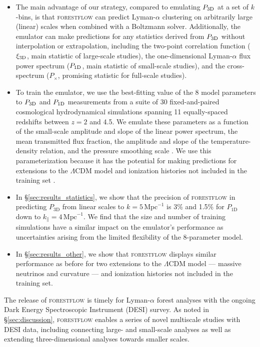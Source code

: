 \documentclass{aa}
\newcommand{\lya}{Lyman-$\alpha$\xspace}
\newcommand{\lyaf}{Lyman-$\alpha$ forest\xspace}
\newcommand{\pcross}{$P_{\times}$\xspace}
\newcommand{\poned}{\ensuremath{P_{\rm 1D}}\xspace}
\newcommand{\xithreed}{\ensuremath{\xi_{\rm 3D}}\xspace}
\newcommand{\pthreed}{\ensuremath{P_{\rm 3D}}\xspace}
\newcommand{\forestflow}{\textsc{forestflow}\xspace}
\newcommand{\iMpc}{\ensuremath{\,\mathrm{Mpc}^{-1}}}
\begin{document}
\begin{itemize}
    \item The main advantage of our strategy, compared to emulating \pthreed at a set of $k$-bins, is that \forestflow can predict \lya clustering on arbitrarily large (linear) scales when combined with a Boltzmann solver. Additionally, the emulator can make predictions for any statistics derived from \pthreed without interpolation or extrapolation, including the two-point correlation function (\xithreed, main statistic of large-scale studies), the one-dimensional \lya flux power spectrum (\poned, main statistic of small-scale studies), and the cross-spectrum (\pcross, promising statistic for full-scale studies).

    \item To train the emulator, we use the best-fitting value of the 8 model parameters to \pthreed and \poned measurements from a suite of 30 fixed-and-paired cosmological hydrodynamical simulations spanning 11 equally-spaced redshifts between $z=2$ and 4.5. We emulate these parameters as a function of the small-scale amplitude and slope of the linear power spectrum, the mean transmitted flux fraction, the amplitude and slope of the temperature-density relation, and the pressure smoothing scale \citep[see][]{Pedersen2021}. We use this parameterization because it has the potential for making predictions for extensions to the $\Lambda$CDM model and ionization histories not included in the training set \citep[][]{ pedersen2023CompressingCosmologicalInformation, cabayol-garcia2023NeuralNetworkEmulator}. 

    \item In \S\ref{sec:results_statistics}, we show that the precision of \textsc{forestflow} in predicting $P_\mathrm{3D}$ from linear scales to $k=5\iMpc$ is 3\% and 1.5\% for $P_\mathrm{1D}$ down to $k_\parallel=4\iMpc$. We find that the size and number of training simulations have a similar impact on the emulator's performance as uncertainties arising from the limited flexibility of the 8-parameter model. 

    \item In \S\ref{sec:results_other}, we show that \forestflow displays similar performance as before for two extensions to the $\Lambda$CDM model --- massive neutrinos and curvature --- and ionization histories not included in the training set. 
\end{itemize}

The release of \forestflow is timely for \lyaf analyses with the ongoing Dark Energy Spectroscopic Instrument (DESI) survey. As noted in \S\ref{sec:discussion}, \forestflow enables a series of novel multiscale studies with DESI data, including connecting large- and small-scale analyses as well as extending three-dimensional analyses towards smaller scales.
\end{document}
